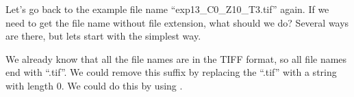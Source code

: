 Let's go back to the example file name ``exp13\_C0\_Z10\_T3.tif'' again. If we need to get the file name without file extension, what should we do? Several ways are there, but lets start with the simplest way.

We already know that all the file names are in the TIFF format, so all file names end with ``.tif''.  We could remove this suffix by replacing the ``.tif'' with a string with length 0. We could do this by using .